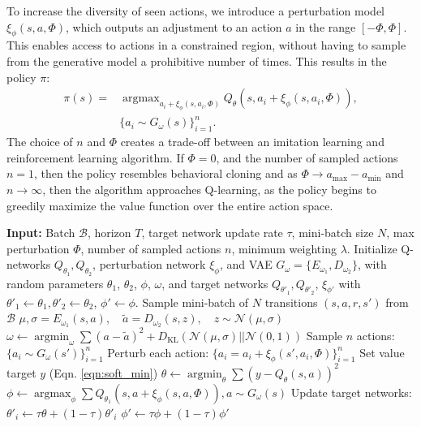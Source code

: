 \documentclass{article}
\newcommand{\s}{\sigma}
\newcommand{\ta}{\theta}
\newcommand{\w}{\omega}
\newcommand{\N}{\mathcal{N}}
\newcommand{\B}{\mathcal{B}}
\DeclareMathOperator*{\argmin}{argmin}
\DeclareMathOperator*{\argmax}{argmax}
\begin{document}
To increase the diversity of seen actions, we introduce a perturbation model $\xi_\phi(s,a, \Phi)$, which outputs an adjustment to an action $a$ in the range $[-\Phi, \Phi]$. This enables access to actions in a constrained region, without having to sample from the generative model a prohibitive number of times. This results in the policy $\pi$: 
\begin{equation}
\begin{split}
\pi(s) = &\argmax_{a_i + \xi_\phi(s, a_i, \Phi)} Q_\ta(s,a_i + \xi_\phi(s, a_i, \Phi)),\\ 
&\{a_i \sim G_\w(s)\}_{i=1}^n.    
\end{split}
\end{equation}
The choice of $n$ and $\Phi$ creates a trade-off between an imitation learning and reinforcement learning algorithm. If $\Phi = 0$, and the number of sampled actions $n=1$, then the policy resembles behavioral cloning and as $\Phi \rightarrow a_{\text{max}} - a_{\text{min}}$ and $n \rightarrow \infty$, then the algorithm approaches Q-learning, as the policy begins to greedily maximize the value function over the entire action space. 

\begin{algorithm}[t]
  \caption{BCQ}
  \label{algorithm:BCQ}
\begin{algorithmic}
	\STATE \textbf{Input:} Batch $\B$, horizon $T$, target network update rate $\tau$, mini-batch size $N$, max perturbation $\Phi$, number of sampled actions $n$, minimum weighting $\lambda$. 
	\STATE Initialize Q-networks $Q_{\ta_1}, Q_{\ta_2}$, perturbation network $\xi_\phi$, and VAE $G_\w = \{E_{\w_1}, D_{\w_2}\}$, with random parameters $\ta_1$, $\ta_2$, $\phi$, $\w$, and target networks $Q_{\ta'_1}, Q_{\ta'_2}$, $\xi_{\phi'}$ with $\ta'_1 \leftarrow \ta_1, \ta'_2 \leftarrow \ta_2$, $\phi' \leftarrow \phi$.
	\STATE Sample mini-batch of $N$ transitions $(s, a, r, s')$ from $\B$
	\STATE $\mu, \s = E_{\w_1}(s,a), \quad \tilde a = D_{\w_2}(s,z), \quad z \sim \N(\mu, \s)$ %
	\STATE $\w \leftarrow \argmin_\w \sum (a - \tilde a)^2 + D_{\text{KL}}(\N(\mu, \s)||\N(0,1))$ %
	\STATE Sample $n$ actions: $\{a_i \sim G_\w(s')\}_{i=1}^n$ 
	\STATE Perturb each action: $\{a_i = a_i + \xi_\phi(s',a_i, \Phi)\}_{i=1}^n$
	\STATE Set value target $y$ (Eqn. \ref{eqn:soft_min})
	\STATE $\ta \leftarrow \argmin_\ta \sum (y - Q_\ta(s,a))^2$ %
	\STATE $\phi \leftarrow \argmax_\phi \sum Q_{\ta_1}(s,a + \xi_\phi(s, a, \Phi)), a \sim G_\w(s)$ %
	\STATE Update target networks: $\ta'_i \leftarrow \tau \ta + (1 - \tau) \ta'_i$
	\STATE $\phi' \leftarrow \tau \phi + (1 - \tau) \phi'$
	\ENDFOR
\end{algorithmic}
\end{algorithm}
\end{document}
